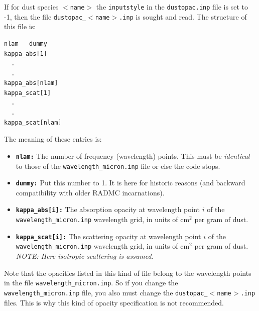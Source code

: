 \documentclass{report}
\newenvironment{asciibox}%
  {\begin{list}{}{%
    \setlength{\topsep}{0.5em}%
    \setlength{\parskip}{0em}%
    \setlength{\parsep}{0em}%
    \setlength{\itemsep}{0em}%
    \setlength{\rightmargin}{0em}%
    \setlength{\leftmargin}{3.0em}%
    \setlength{\labelsep}{1em}%
    \setlength{\labelwidth}{2em}%
  }\normalfont\footnotesize\item}
  {\end{list}}
\begin{document}
If for dust species {\small\tt $<$name$>$} the {\small\tt inputstyle} in the 
{\small\tt dustopac.inp} file is set to -1, then the file {\small\tt dustopac\_$<$name$>$.inp}
is sought and read. The structure of this file is:
\begin{asciibox}\begin{verbatim}
nlam   dummy
kappa_abs[1]
  .
  .
kappa_abs[nlam]
kappa_scat[1]
  .
  .
kappa_scat[nlam]
\end{verbatim}\end{asciibox}
The meaning of these entries is:
\begin{itemize}
\item[] {\small\tt\bf nlam:} The number of frequency (wavelength) points. This
  must be {\em identical} to those of the {\small\tt wavelength\_micron.inp} file
  or else the code stops.
\item[] {\small\tt\bf dummy:} Put this number to 1. It is here for historic
  reasons (and backward compatibility with older RADMC incarnations).
\item[] {\small\tt\bf kappa\_abs[i]:} The absorption opacity at wavelength point
  $i$ of the {\small\tt wavelength\_micron.inp} wavelength grid, in units of
  cm$^2$ per gram of dust.
\item[] {\small\tt\bf kappa\_scat[i]:} The scattering opacity at wavelength point
  $i$ of the {\small\tt wavelength\_micron.inp} wavelength grid, in units of
  cm$^2$ per gram of dust. {\em NOTE: Here isotropic scattering is assumed.}
\end{itemize}
Note that the opacities listed in this kind of file belong to the wavelength
points in the file {\small\tt wavelength\_micron.inp}. So if you change the {\small\tt
  wavelength\_micron.inp} file, you also must change the
{\small\tt dustopac\_$<$name$>$.inp} files. This is why this kind of opacity
specification is not recommended.


% 
\end{document}
